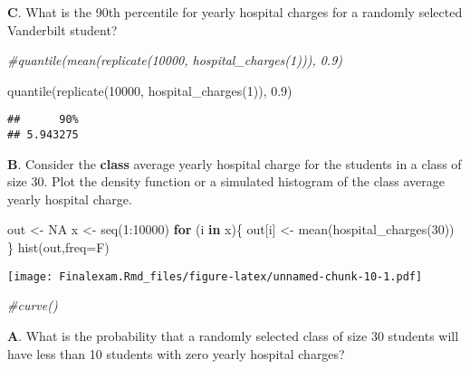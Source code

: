 \documentclass[
]{article}
\newenvironment{Shaded}{\begin{snugshade}}{\end{snugshade}}
\newcommand{\AttributeTok}[1]{\textcolor[rgb]{0.77,0.63,0.00}{#1}}
\newcommand{\CommentTok}[1]{\textcolor[rgb]{0.56,0.35,0.01}{\textit{#1}}}
\newcommand{\ConstantTok}[1]{\textcolor[rgb]{0.00,0.00,0.00}{#1}}
\newcommand{\ControlFlowTok}[1]{\textcolor[rgb]{0.13,0.29,0.53}{\textbf{#1}}}
\newcommand{\DecValTok}[1]{\textcolor[rgb]{0.00,0.00,0.81}{#1}}
\newcommand{\FloatTok}[1]{\textcolor[rgb]{0.00,0.00,0.81}{#1}}
\newcommand{\FunctionTok}[1]{\textcolor[rgb]{0.00,0.00,0.00}{#1}}
\newcommand{\NormalTok}[1]{#1}
\newcommand{\OtherTok}[1]{\textcolor[rgb]{0.56,0.35,0.01}{#1}}
\newcommand{\SpecialCharTok}[1]{\textcolor[rgb]{0.00,0.00,0.00}{#1}}
\begin{document}
\textbf{C}. What is the 90th percentile for yearly hospital charges for
a randomly selected Vanderbilt student?

\begin{Shaded}
\begin{Highlighting}[]
\CommentTok{\#quantile(mean(replicate(10000, hospital\_charges(1))), 0.9)}
\end{Highlighting}
\end{Shaded}

\begin{Shaded}
\begin{Highlighting}[]
\FunctionTok{quantile}\NormalTok{(}\FunctionTok{replicate}\NormalTok{(}\DecValTok{10000}\NormalTok{, }\FunctionTok{hospital\_charges}\NormalTok{(}\DecValTok{1}\NormalTok{)), }\FloatTok{0.9}\NormalTok{)}
\end{Highlighting}
\end{Shaded}

\begin{verbatim}
##      90% 
## 5.943275
\end{verbatim}

\textbf{B}. Consider the \textbf{class} average yearly hospital charge
for the students in a class of size 30. Plot the density function or a
simulated histogram of the class average yearly hospital charge.

\begin{Shaded}
\begin{Highlighting}[]
\NormalTok{out }\OtherTok{\textless{}{-}} \ConstantTok{NA}
\NormalTok{x }\OtherTok{\textless{}{-}} \FunctionTok{seq}\NormalTok{(}\DecValTok{1}\SpecialCharTok{:}\DecValTok{10000}\NormalTok{)}
\ControlFlowTok{for}\NormalTok{ (i }\ControlFlowTok{in}\NormalTok{ x)\{}
\NormalTok{  out[i] }\OtherTok{\textless{}{-}} \FunctionTok{mean}\NormalTok{(}\FunctionTok{hospital\_charges}\NormalTok{(}\DecValTok{30}\NormalTok{))}
\NormalTok{\}}
\FunctionTok{hist}\NormalTok{(out,}\AttributeTok{freq=}\NormalTok{F)}
\end{Highlighting}
\end{Shaded}

\texttt{[image: Finalexam.Rmd\_files/figure-latex/unnamed-chunk-10-1.pdf]}

\begin{Shaded}
\begin{Highlighting}[]
\CommentTok{\#curve()}
\end{Highlighting}
\end{Shaded}

\textbf{A}. What is the probability that a randomly selected class of
size 30 students will have less than 10 students with zero yearly
hospital charges?
\end{document}
